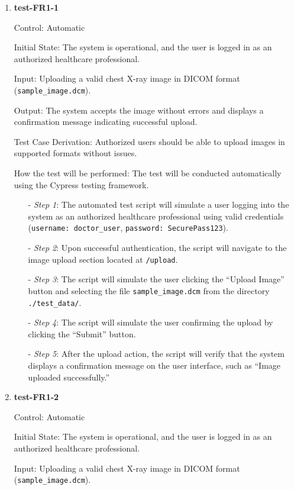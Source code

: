 \documentclass[12pt, titlepage]{article}
\begin{document}
\begin{enumerate}

\item \textbf{test-FR1-1} \label{test-FR1-1}

Control: Automatic

Initial State: The system is operational, and the user is logged in as an authorized healthcare professional.

Input: Uploading a valid chest X-ray image in DICOM format (\texttt{sample\_image.dcm}).

Output: The system accepts the image without errors and displays a confirmation message indicating successful upload.

Test Case Derivation: Authorized users should be able to upload images in supported formats without issues.

How the test will be performed: The test will be conducted automatically using the Cypress testing framework.
\begin{itemize}
  \item[-] \textit{Step 1}: The automated test script will simulate a user logging into the system as an authorized healthcare professional using valid credentials (\texttt{username: doctor\_user}, \texttt{password: SecurePass123}).
  \item[-] \textit{Step 2}: Upon successful authentication, the script will navigate to the image upload section located at \texttt{/upload}.
  \item[-] \textit{Step 3}: The script will simulate the user clicking the ``Upload Image'' button and selecting the file \texttt{sample\_image.dcm} from the directory \texttt{./test\_data/}.
  \item[-] \textit{Step 4}: The script will simulate the user confirming the upload by clicking the ``Submit'' button.
  \item[-] \textit{Step 5}: After the upload action, the script will verify that the system displays a confirmation message on the user interface, such as ``Image uploaded successfully.''
  \end{itemize}


\item \textbf{test-FR1-2} \label{test-FR1-2}

Control: Automatic

Initial State: The system is operational, and the user is logged in as an authorized healthcare professional.

Input: Uploading a valid chest X-ray image in DICOM format (\texttt{sample\_image.dcm}).


\end{enumerate}
\end{document}
